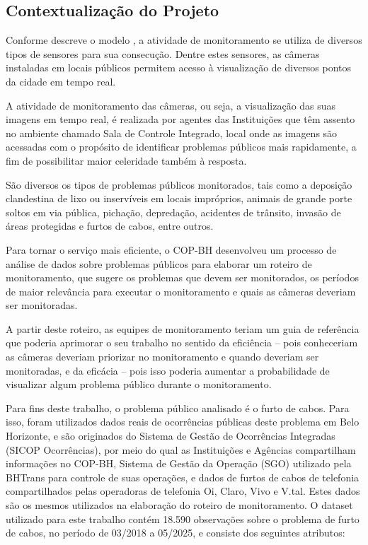 \subsection{Contextualização do Projeto}

Conforme descreve o modelo \cite{ModeloGestaoCOP}, a atividade de monitoramento se utiliza de diversos tipos de sensores para sua consecução. Dentre estes sensores, as câmeras instaladas em locais públicos permitem acesso à visualização de diversos pontos da cidade em tempo real.

A atividade de monitoramento das câmeras, ou seja, a visualização das suas imagens em tempo real, é realizada por agentes das Instituições que têm assento no ambiente chamado Sala de Controle Integrado, local onde as imagens são acessadas com o propósito de identificar problemas públicos mais rapidamente, a fim de possibilitar maior celeridade também à resposta.

São diversos os tipos de problemas públicos monitorados, tais como a deposição clandestina de lixo ou inservíveis em locais impróprios, animais de grande porte soltos em via pública, pichação, depredação, acidentes de trânsito, invasão de áreas protegidas e furtos de cabos, entre outros.

Para tornar o serviço mais eficiente, o COP-BH desenvolveu um processo de análise de dados sobre problemas públicos para elaborar um roteiro de monitoramento, que sugere os problemas que devem ser monitorados, os períodos de maior relevância para executar o monitoramento e quais as câmeras deveriam ser monitoradas. 

A partir deste roteiro, as equipes de monitoramento teriam um guia de referência que poderia aprimorar o seu trabalho no sentido da eficiência -- pois conheceriam as câmeras deveriam priorizar no monitoramento e quando deveriam ser monitoradas, e da eficácia -- pois isso poderia aumentar a probabilidade de visualizar algum problema público durante o monitoramento.

Para fins deste trabalho, o problema público analisado é o furto de cabos. Para isso, foram utilizados dados reais de ocorrências públicas deste problema em Belo Horizonte, e são originados do Sistema de Gestão de Ocorrências Integradas (SICOP Ocorrências), por meio do qual as Instituições e Agências compartilham informações no COP-BH, Sistema de Gestão da Operação (SGO) utilizado pela BHTrans para controle de suas operações, e dados de furtos de cabos de telefonia compartilhados pelas operadoras de telefonia Oi, Claro, Vivo e V.tal. Estes dados são os mesmos utilizados na elaboração do roteiro de monitoramento. O dataset utilizado para este trabalho contém 18.590 observações sobre o problema de furto de cabos, no período de 03/2018 a 05/2025, e consiste dos seguintes atributos:

